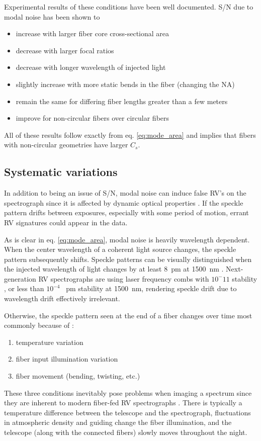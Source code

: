 \documentclass[twocolumn]{emulateapj}
\begin{document}
Experimental results of these conditions have been well documented. S/N due to modal noise has been shown to
\begin{itemize}
\item increase with larger fiber core cross-sectional area \citep{Sablowski2015, Lemke2010}
\item decrease with larger focal ratios \citep{Sablowski2015, Baudrand2001}
\item decrease with longer wavelength of injected light \citep{Baudrand2001}
\item slightly increase with more static bends in the fiber (changing the NA) \citep{Imai1979}
\item remain the same for differing fiber lengths greater than a few meters \citep{Baudrand2001}
\item improve for non-circular fibers over circular fibers \citep{Sturmer2016, Sablowski2015}
\end{itemize}
All of these results follow exactly from eq. \ref{eq:mode_area} and implies that fibers with non-circular geometries have larger $C_{s}$.

\subsection{Systematic variations}

In addition to being an issue of S/N, modal noise can induce false RV's on the spectrograph since it is affected by dynamic optical properties \citep{Mahadevan2014}. If the speckle pattern drifts between exposures, especially with some period of motion, errant RV signatures could appear in the data.

As is clear in eq. \ref{eq:mode_area}, modal noise is heavily wavelength dependent. When the center wavelength of a coherent light source changes, the speckle pattern subsequently shifts.  Speckle patterns can be visually distinguished when the injected wavelength of light changes by at least \SI{8}{\pico\meter} at \SI{1500}{\nano\meter} \citep{Redding2013}. Next-generation RV spectrographs are using laser frequency combs with $10^-11$ stability \citep{Probst2014}, or less than $10^{-4}$ \SI{}{\pico\meter} stability at \SI{1500}{\nano\meter}, rendering speckle drift due to wavelength drift effectively irrelevant.

Otherwise, the speckle pattern seen at the end of a fiber changes over time most commonly because of \citep{Epworth1978}:
\begin{enumerate}
\item temperature variation
\item fiber input illumination variation
\item fiber movement (bending, twisting, etc.)
\end{enumerate}
These three conditions inevitably pose problems when imaging a spectrum since they are inherent to modern fiber-fed RV spectrographs \citep{Baudrand2001, Mahadevan2014}. There is typically a temperature difference between the telescope and the spectrograph, fluctuations in atmospheric density and guiding change the fiber illumination, and the telescope (along with the connected fibers) slowly moves throughout the night.
\end{document}
